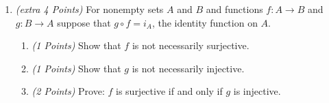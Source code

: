 \documentclass[10pt]{article} %
\newcommand{\points}[1]{{\it (#1 Points)}}
\begin{document}
\begin{enumerate}
\item \points{extra 4} For nonempty sets $A$ and $B$ and functions $f : A \rightarrow
  B$ and $g: B \rightarrow A$ suppose that $g \circ f = i_A$, the
  identity function on $A$.
  \begin{enumerate}
    \item \points{1} Show that $f$ is not necessarily surjective.
    \item \points{1} Show that $g$ is not necessarily injective.
    \item \points{2} Prove: $f$ is surjective if and only if $g$ is injective.
    \end{enumerate}

\end{enumerate}
\end{document}

